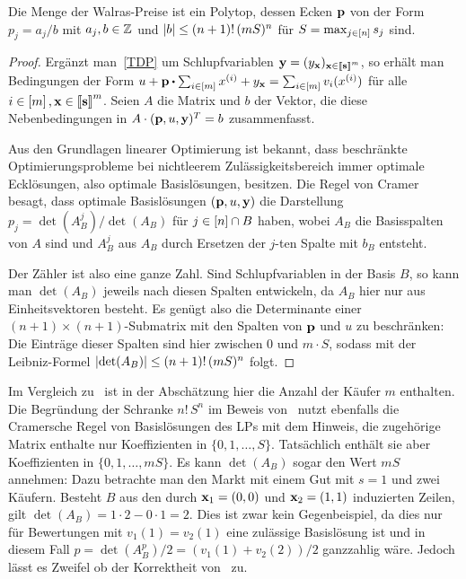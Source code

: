 \begin{lemma}\label{lemma-prices-bounded-S}
	Die Menge der Walras-Preise ist ein Polytop, dessen Ecken $\mathbf{p}$ von der Form $p_j = a_j/b$ mit $a_j,b\in\mathbb{Z}$ und
	$\left\lvert b \right\rvert \leq (n+1)!\, (mS)^n$
	für $S = \max_{j\in\left[ n \right]} s_j$ sind.
\end{lemma}
\begin{proof}
	Ergänzt man~\eqref{TDP} um Schlupfvariablen $\mathbf{y}=(y_{\mathbf{x}})_{\mathbf{x}\in\left\llbracket \mathbf{s} \right\rrbracket^m}$, so erhält man Bedingungen der Form $ u + \fp \bcdot \sum_{i\in\first{m}} x^{(i)} + y_{\fx} = \sum_{i\in\first{m}} v_i(x^{(i)}) $ für alle $i\in\left[ m \right], \mathbf{x}\in\left\llbracket \mathbf{s} \right\rrbracket^m$.
	Seien $A$ die Matrix und $b$ der Vektor, die diese Nebenbedingungen in $A \cdot (\mathbf{p}, u, \mathbf{y})^T = b$ zusammenfasst.
	
	
	Aus den Grundlagen linearer Optimierung ist bekannt, dass beschränkte Optimierungsprobleme bei nichtleerem Zulässigkeitsbereich immer optimale Ecklösungen, also optimale Basislösungen, besitzen.
	Die Regel von Cramer besagt, dass optimale Basislösungen $(\mathbf{p}, u, \mathbf{y})$ die Darstellung $p_j = \det(A_B^j) / \det(A_B)$ für $j\in\left[ n \right]\cap B$ haben, wobei $A_B$ die Basisspalten von $A$ sind und $A_B^j$ aus $A_B$ durch Ersetzen der $j$-ten Spalte mit $b_B$ entsteht.
	
	Der Zähler ist also eine ganze Zahl.
	Sind Schlupfvariablen in der Basis $B$, so kann man $\det(A_B)$ jeweils nach diesen Spalten entwickeln, da $A_B$ hier nur aus Einheitsvektoren besteht.
	Es genügt also die Determinante einer $(n+1)\times(n+1)$-Submatrix mit den Spalten von $\mathbf{p}$ und $u$ zu beschränken:
 	Die Einträge dieser Spalten sind hier zwischen 0 und $m\cdot S$, sodass mit der Leibniz-Formel $\left\lvert \det(A_B) \right\rvert \leq (n+1)!\, (m S)^{n}$ folgt.
\end{proof}
\begin{bemerkung}
	Im Vergleich zu~\cite[Lemma~5]{PaesLeme2018} ist in der Abschätzung hier die Anzahl der Käufer $m$ enthalten.
	Die Begründung der Schranke $n!\,S^n$ im Beweis von~\cite[Lemma~5]{PaesLeme2018} nutzt ebenfalls die Cramersche Regel von Basislösungen des LPs mit dem Hinweis, die zugehörige Matrix enthalte nur Koeffizienten in $\{0, 1,\dots, S\}$.
	Tatsächlich enthält sie aber Koeffizienten in $\{0, 1, \dots, mS \}$.
	Es kann $\det(A_B)$ sogar den Wert $mS$ annehmen: Dazu betrachte man den Markt mit einem Gut mit $s=1$ und zwei Käufern.
	Besteht $B$ aus den durch $\mathbf{x}_1 = (0,0)$ und $\mathbf{x}_2= (1,1)$ induzierten Zeilen, gilt $\det(A_B) = 1\cdot 2 - 0 \cdot 1 = 2$.
	Dies ist zwar kein Gegenbeispiel, da dies nur für Bewertungen mit $v_1(1) = v_2(1)$ eine zulässige Basislösung ist und in diesem Fall $p = \det({A_B^p}) / 2 = (v_1(1) + v_2(2)) / 2$ ganzzahlig wäre.
	Jedoch lässt es Zweifel ob der Korrektheit von~\cite[Lemma~5]{PaesLeme2018} zu.
\end{bemerkung}

